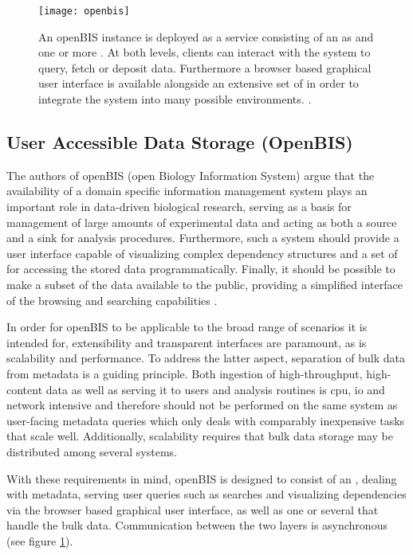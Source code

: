 \begin{figure}
  \centering
  \texttt{[image: openbis]}
  \caption[Overview of the openBIS architecture and a more in-depth look at the data storage implementation.]{An openBIS instance is deployed as a service consisting of an \acrfull{as} and one or more . At both levels, clients can interact with the system to query, fetch or deposit data. Furthermore a browser based graphical user interface is available alongside an extensive set of  in order to integrate the system into many possible environments. \citep{Bauch2011}.}
  \label{fig:openbis}
\end{figure}

\subsection{User Accessible Data Storage (OpenBIS)}
The authors of openBIS (open Biology Information System) argue that the availability of a domain specific information management system plays an important role in data-driven biological research, serving as a basis for management of large amounts of experimental data and acting as both a source and a sink for analysis procedures. Furthermore, such a system should provide a user interface capable of visualizing complex dependency structures and a set of  for accessing the stored data programmatically. Finally, it should be possible to make a subset of the data available to the public, providing a simplified interface of the browsing and searching capabilities \citep{Bauch2011}.

In order for openBIS to be applicable to the broad range of scenarios it is intended for, extensibility and transparent interfaces are paramount, as is scalability and performance. To address the latter aspect, separation of bulk data from metadata is a guiding principle. Both ingestion of high-throughput, high-content data as well as serving it to users and analysis routines is \acrshort{cpu}, \acrshort{io} and network intensive and therefore should not be performed on the same system as user-facing metadata queries which only deals with comparably inexpensive tasks that scale well. Additionally, scalability requires that bulk data storage may be distributed among several systems.

With these requirements in mind, openBIS is designed to consist of an , dealing with metadata, serving user queries such as searches and visualizing dependencies via the browser based graphical user interface, as well as one or several  that handle the bulk data. Communication between the two layers is asynchronous (see figure \ref{fig:openbis}).

